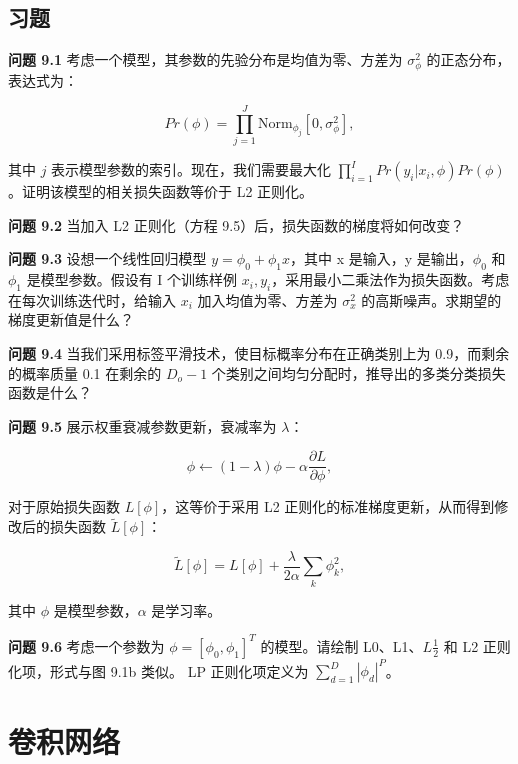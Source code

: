 \documentclass[lang=cn,newtx,10pt,scheme=chinese]{elegantbook}
\begin{document}
\section{习题}
\textbf{问题 9.1} 考虑一个模型，其参数的先验分布是均值为零、方差为 \(\sigma_{\phi}^2\) 的正态分布，表达式为：

\begin{equation}
Pr(\phi) = \prod_{j=1}^{J} \text{Norm}_{\phi_j} [0, \sigma_{\phi}^2], 
\end{equation}

其中 \( j \) 表示模型参数的索引。现在，我们需要最大化 \(\prod_{i=1}^{I} Pr(y_i|x_i, \phi)Pr(\phi)\)。证明该模型的相关损失函数等价于 L2 正则化。

\textbf{问题 9.2} 当加入 L2 正则化（方程 9.5）后，损失函数的梯度将如何改变？

\textbf{问题 9.3} 设想一个线性回归模型 \(y = \phi_0 + \phi_1 x\)，其中 x 是输入，y  是输出，\(\phi_0\) 和 \(\phi_1\) 是模型参数。假设有 I 个训练样例 \({x_i, y_i}\)，采用最小二乘法作为损失函数。考虑在每次训练迭代时，给输入 \(x_i\) 加入均值为零、方差为 \(\sigma_{x}^2\) 的高斯噪声。求期望的梯度更新值是什么？

\textbf{问题 9.4} 当我们采用标签平滑技术，使目标概率分布在正确类别上为 0.9，而剩余的概率质量 0.1 在剩余的 \(D_o - 1\) 个类别之间均匀分配时，推导出的多类分类损失函数是什么？

\textbf{问题 9.5} 展示权重衰减参数更新，衰减率为 \(\lambda\)：

\begin{equation}
\phi \leftarrow (1 - \lambda) \phi - \alpha \frac{\partial L}{\partial \phi}, 
\end{equation}

对于原始损失函数 \(L[\phi]\)，这等价于采用 L2 正则化的标准梯度更新，从而得到修改后的损失函数 \(\tilde{L}[\phi]\)：

\begin{equation}
\tilde{L}[\phi] = L[\phi] + \frac{\lambda}{2\alpha} \sum_{k} \phi_k^2, 
\end{equation}

其中 \(\phi\) 是模型参数，\(\alpha\) 是学习率。

\textbf{问题 9.6} 考虑一个参数为 \(\phi = [\phi_0, \phi_1]^T\) 的模型。请绘制 L0、L1、\(L\frac{1}{2}\) 和 L2 正则化项，形式与图 9.1b 类似。 LP 正则化项定义为 \(\sum_{d=1}^{D} |\phi_d|^P\)。


\chapter{卷积网络}
\end{document}
